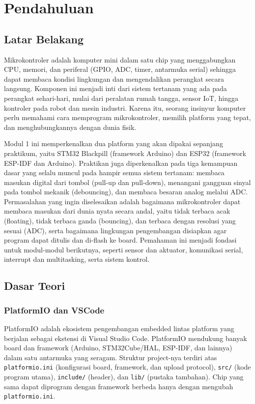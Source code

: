 \section{Pendahuluan}
\subsection{Latar Belakang}
Mikrokontroler adalah komputer mini dalam satu chip yang menggabungkan CPU, memori, dan periferal (GPIO, ADC, timer, antarmuka serial) sehingga dapat membaca kondisi lingkungan dan mengendalikan perangkat secara langsung. Komponen ini menjadi inti dari sistem tertanam yang ada pada perangkat sehari-hari, mulai dari peralatan rumah tangga, sensor IoT, hingga kontroler pada robot dan mesin industri. Karena itu, seorang insinyur komputer perlu memahami cara memprogram mikrokontroler, memilih platform yang tepat, dan menghubungkannya dengan dunia fisik.

Modul 1 ini memperkenalkan dua platform yang akan dipakai sepanjang praktikum, yaitu STM32 Blackpill (framework Arduino) dan ESP32 (framework ESP-IDF dan Arduino). Praktikan juga diperkenalkan pada tiga kemampuan dasar yang selalu muncul pada hampir semua sistem tertanam: membaca masukan digital dari tombol (pull-up dan pull-down), menangani gangguan sinyal pada tombol mekanik (debouncing), dan membaca besaran analog melalui ADC. Permasalahan yang ingin diselesaikan adalah bagaimana mikrokontroler dapat membaca masukan dari dunia nyata secara andal, yaitu tidak terbaca acak (floating), tidak terbaca ganda (bouncing), dan terbaca dengan resolusi yang sesuai (ADC), serta bagaimana lingkungan pengembangan disiapkan agar program dapat ditulis dan di-flash ke board. Pemahaman ini menjadi fondasi untuk modul-modul berikutnya, seperti sensor dan aktuator, komunikasi serial, interrupt dan multitasking, serta sistem kontrol.

\subsection{Dasar Teori}
\subsubsection{PlatformIO dan VSCode}
PlatformIO adalah ekosistem pengembangan embedded lintas platform yang berjalan sebagai ekstensi di Visual Studio Code. PlatformIO mendukung banyak board dan framework (Arduino, STM32Cube/HAL, ESP-IDF, dan lainnya) dalam satu antarmuka yang seragam. Struktur project-nya terdiri atas \texttt{platformio.ini} (konfigurasi board, framework, dan upload protocol), \texttt{src/} (kode program utama), \texttt{include/} (header), dan \texttt{lib/} (pustaka tambahan). Chip yang sama dapat diprogram dengan framework berbeda hanya dengan mengubah \texttt{platformio.ini}.

